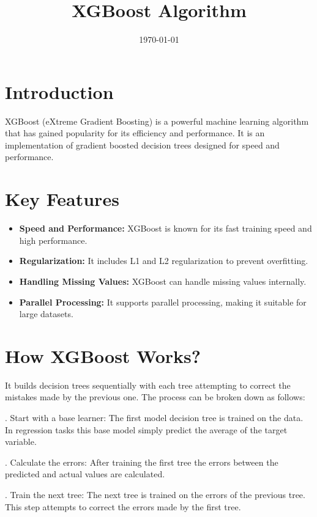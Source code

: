 \documentclass{article}
\title{XGBoost Algorithm}
\date{\today}
\begin{document}
\maketitle

\section{Introduction}
XGBoost (eXtreme Gradient Boosting) is a powerful machine 
learning algorithm that has gained popularity for its efficiency 
and performance. It is an implementation of gradient boosted 
decision trees designed for speed and performance.

\section{Key Features}
\begin{itemize}
    \item \textbf{Speed and Performance:} XGBoost is known for 
    its fast training speed and high performance.
    \item \textbf{Regularization:} It includes L1 and L2 
    regularization to prevent overfitting.
    \item \textbf{Handling Missing Values:} XGBoost can handle 
    missing values internally.
    \item \textbf{Parallel Processing:} It supports parallel 
    processing, making it suitable for large datasets.
\end{itemize}


\section{How XGBoost Works?}
It builds decision trees sequentially with each tree attempting 
to correct the mistakes made by the previous one. The process 
can be broken down as follows:

\smallskip
{}. Start with a base learner: The first model decision tree is 
trained on the data. In regression tasks this base model simply 
predict the average of the target variable.

\smallskip
{}. Calculate the errors: After training the first tree the 
errors between the predicted and actual values are calculated.

\smallskip
{}. Train the next tree: The next tree is trained on the errors 
of the previous tree. This step attempts to correct the errors 
made by the first tree.
\end{document}
